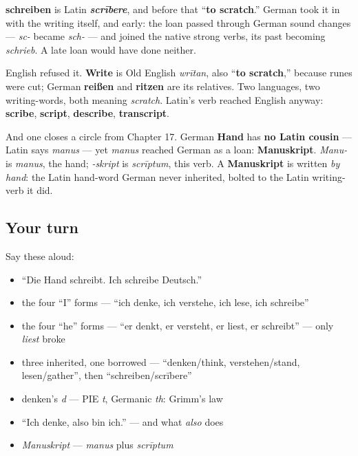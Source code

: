 \begin{cousinweb}
\textbf{schreiben} is Latin \emph{\textbf{scrībere}}, and before that \textquotedblleft{}\textbf{to scratch}.\textquotedblright{} German took it in with the writing itself, and early: the loan passed through German sound changes — \emph{sc-} became \emph{sch-} — and joined the native strong verbs, its past becoming \emph{schrieb}. A late loan would have done neither.

English refused it. \textbf{Write} is Old English \emph{wrītan}, also \textquotedblleft{}\textbf{to scratch},\textquotedblright{} because runes were cut; German \textbf{reißen} and \textbf{ritzen} are its relatives. Two languages, two writing-words, both meaning \emph{scratch}. Latin's verb reached English anyway: \textbf{scribe}, \textbf{script}, \textbf{describe}, \textbf{transcript}.

And one closes a circle from Chapter 17. German \textbf{Hand} has \textbf{no Latin cousin} — Latin says \emph{manus} — yet \emph{manus} reached German as a loan: \textbf{Manuskript}. \emph{Manu-} is \emph{manus}, the hand; \emph{-skript} is \emph{scrīptum}, this verb. A \textbf{Manuskript} is written \emph{by hand}: the Latin hand-word German never inherited, bolted to the Latin writing-verb it did.
\end{cousinweb}

\subsection*{Your turn}
Say these aloud:

\begin{itemize}
\raggedright
  \item \textquotedblleft{}Die Hand schreibt. Ich schreibe Deutsch.\textquotedblright{}
  \item the four \textquotedblleft{}I\textquotedblright{} forms — \textquotedblleft{}ich denke, ich verstehe, ich lese, ich schreibe\textquotedblright{}
  \item the four \textquotedblleft{}he\textquotedblright{} forms — \textquotedblleft{}er denkt, er versteht, er liest, er schreibt\textquotedblright{} — only \emph{liest} broke
  \item three inherited, one borrowed — \textquotedblleft{}denken/think, verstehen/stand, lesen/gather\textquotedblright{}, then \textquotedblleft{}schreiben/scrībere\textquotedblright{}
  \item denken's \emph{d} — PIE \emph{t}, Germanic \emph{th}: Grimm's law
  \item \textquotedblleft{}Ich denke, also bin ich.\textquotedblright{} — and what \emph{also} does
  \item \emph{Manuskript} — \emph{manus} plus \emph{scrīptum}
\end{itemize}

